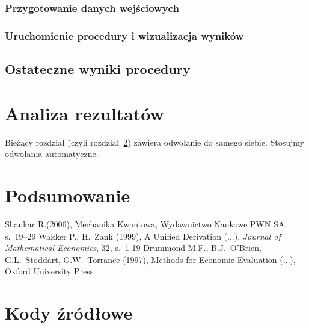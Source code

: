 \documentclass[12pt,a4paper,twoside,openany]{book}
\begin{document}
\subsection{Przygotowanie danych wejściowych}

\subsection{Uruchomienie procedury i wizualizacja wyników}

\section{Ostateczne wyniki procedury}

\chapter{Analiza rezultatów}
\label{sec:nast}

Bieżący rozdział (czyli rozdział~\ref{sec:nast}) zawiera odwołanie do samego siebie. Stosujmy odwołania automatyczne.

\clearpage

\chapter{Podsumowanie}

\clearpage
{}
\begin{thebibliography}{99}
\setlength{\itemsep}{0pt}%
 Shankar R.(2006), Mechanika Kwantowa, Wydawnictwo Naukowe PWN SA, s.~19--29
 Wakker P., H.~Zank (1999), A Unified Derivation (...), \textit{Journal of  Mathematical Economics}, 32, s.~1-19
 Drummond M.F., B.J.~O'Brien, G.L.~Stoddart, G.W.~Torrance (1997), Methods for Economic Evaluation (...), Oxford University Press
\end{thebibliography}

\clearpage
{}
\listoffigures

\clearpage
\listoftables
{}

\appendix
\chapter*{Kody źródłowe}
\end{document}
